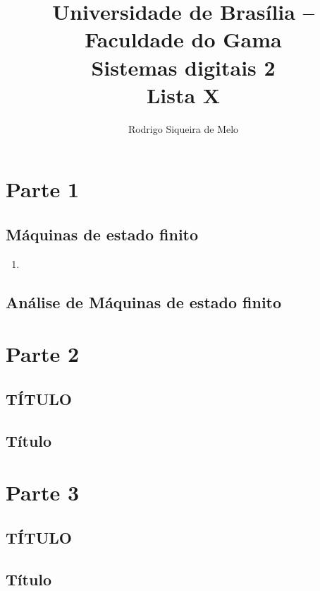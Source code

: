 \documentclass[a4paper,10pt]{article}
\title{ \textbf{Universidade de Brasília -- Faculdade do Gama \\ Sistemas digitais 2 \\ Lista X }}
\author{Rodrigo Siqueira de Melo}
\begin{document}
\maketitle

\section{Parte 1}
\subsection{Máquinas de estado finito}
\begin{enumerate}
 \item 
\end{enumerate}

\subsection{Análise de Máquinas de estado finito}

\section{Parte 2}
\subsection{TÍTULO}
\subsection{Título}

\section{Parte 3}
\subsection{TÍTULO}
\subsection{Título}
\end{document}
